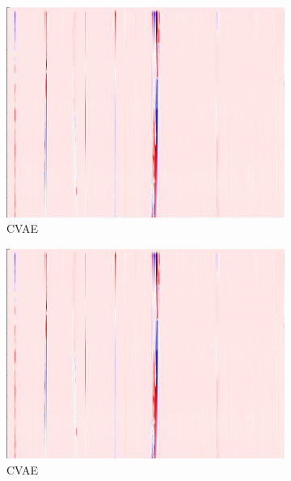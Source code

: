 \begin{figure}[h]
    \begin{subfigure}{0.33\textwidth}
        \includegraphics[width=\textwidth]{figures/test.png}
        \caption{CVAE}
    \end{subfigure}%
    \hfill
    \begin{subfigure}{0.33\textwidth}
        \includegraphics[width=\textwidth]{figures/test.png}
        \caption{CVAE}
    \end{subfigure}%
    \hfill
    \begin{subfigure}{0.33\textwidth}

\end{subfigure}
\end{figure}
